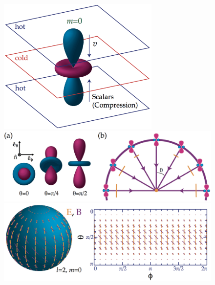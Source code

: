 \documentclass[a4paper,11pt]{article}
\begin{document}
\begin{figure}[t!]
    \centering
    \vspace{-1cm}
    \includegraphics[width=8cm]{figures/ScalarQuadrupole.png}\\
    \includegraphics[width=15cm]{figures/QuadrupolarAnisotropies.png}\\
    \includegraphics[width=15cm]{figures/ScalarPattern.png}

\end{figure}
\end{document}
